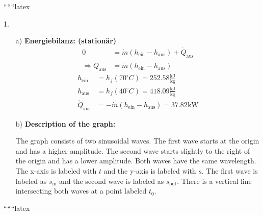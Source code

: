 
``````latex


1. 
\begin{itemize}
    \item[a)] \textbf{Energiebilanz: (stationär)}
    \begin{align*}
        0 &= \dot{m} (h_{\text{ein}} - h_{\text{aus}}) + \dot{Q}_{\text{aus}} \\
        \Rightarrow \dot{Q}_{\text{aus}} &= \dot{m} (h_{\text{ein}} - h_{\text{aus}})
    \end{align*}
    \begin{align*}
        h_{\text{ein}} &= h_f (70^\circ C) = 252.58 \frac{\text{kJ}}{\text{kg}} \\
        h_{\text{aus}} &= h_f (40^\circ C) = 418.09 \frac{\text{kJ}}{\text{kg}} \\
        \dot{Q}_{\text{aus}} &= -\dot{m} (h_{\text{ein}} - h_{\text{aus}}) = 37.82 \text{kW}
    \end{align*}
    
    \item[b)] 
    \textbf{Description of the graph:}
    
    The graph consists of two sinusoidal waves. The first wave starts at the origin and has a higher amplitude. The second wave starts slightly to the right of the origin and has a lower amplitude. Both waves have the same wavelength. The x-axis is labeled with $t$ and the y-axis is labeled with $s$. The first wave is labeled as $s_{\text{in}}$ and the second wave is labeled as $s_{\text{out}}$. There is a vertical line intersecting both waves at a point labeled $t_0$.
\end{itemize}

``````latex


